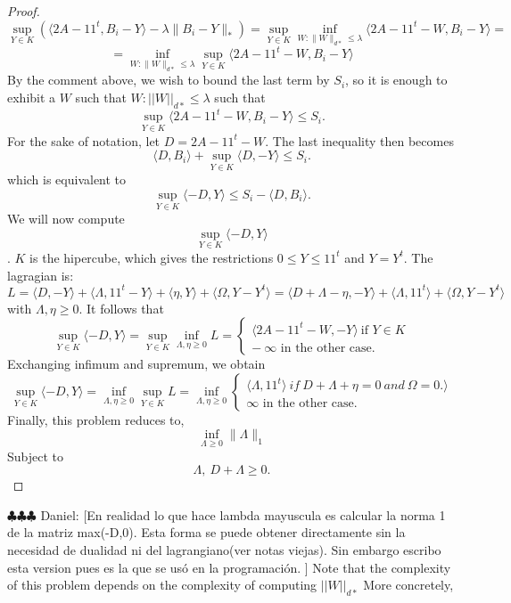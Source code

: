 \documentclass[12pt]{amsart}
\numberwithin{equation}{section}
\newcommand{\ddr}[1]{{\color{blue} \sf $\clubsuit\clubsuit\clubsuit$ Daniel: [#1]}}
\begin{document}
\begin{proof}
\[\sup_{Y\in K} \left(\langle 2A-11^t, B_i-Y\rangle -\lambda \|B_i-Y\|_*\right)=
\sup_{Y\in K} \inf_{W: \|W\|_{d*}\leq \lambda} \langle 2A-11^t-W, B_i-Y\rangle  =\]
\[=\inf_{W: \|W\|_{d*}\leq \lambda}\sup_{Y\in K}\langle 2A-11^t-W, B_i-Y\rangle 
\]
By the comment above, we wish to bound the last term by $S_i$, so it is enough to exhibit a $W$ such that $W: ||W||_{d*} \leq \lambda$ such that
\[
\sup_{Y\in K} \langle 2A-11^t-W, B_i-Y\rangle \leq S_i.
\]
For the sake of notation, let 
$D= 2A-11^t-W$.
The last inequality then becomes
\[
\langle D,B_i\rangle + \sup_{Y \in K}\langle D,-Y \rangle \leq S_i.
\]
which is equivalent to 
\[
 \sup_{Y \in K}\langle -D,Y \rangle \leq S_i-\langle D,B_i\rangle.
\]
We will now compute $$\sup_{Y \in K}\langle -D,Y \rangle$$.
$K$ is the hipercube, which gives the restrictions $0 \leq Y \leq 11^t$ and $Y=Y^t$. 
The lagragian is: 
\[
L = \langle D,-Y \rangle + \langle \Lambda,11^t-Y \rangle + \langle \eta,Y \rangle + \langle \Omega,Y-Y^t \rangle
= \langle D+\Lambda -\eta,-Y \rangle + \langle \Lambda,11^t\rangle + \langle \Omega, Y-Y^t\rangle\]
with $\Lambda,\eta \geq 0$.
It follows that
\[
\sup_{Y \in K}\langle -D,Y \rangle = \sup_{Y \in K} \inf_{\Lambda,\eta \geq 0} L = \begin{cases}
\langle 2A-11^t-W,-Y \rangle \ \text{if } Y \in K\\
- \ \infty \text{ in the other case.}
\end{cases}
\]
Exchanging infimum and supremum, we obtain  
\[
\sup_{Y \in K}\langle -D,Y \rangle = \inf_{\Lambda,\eta \geq 0}\sup_{Y \in K}L= \inf_{\Lambda,\eta \geq 0} 
\begin{cases}
\langle \Lambda, 11^t \rangle \ if \ D+\Lambda + \eta = 0 \ and \ \Omega =0.\rangle \\
\infty \text{ in the other case.}
\end{cases}
\]
Finally, this problem reduces to, 
\[
\inf_{\Lambda \geq0} \|\Lambda\|_1
\]
Subject to 
\[
\Lambda, \ D+\Lambda \geq 0.
\]
\end{proof}
\ddr{En realidad lo que hace lambda mayuscula es calcular la norma 1 de la matriz max(-D,0). Esta forma se puede obtener directamente sin la necesidad de dualidad ni del lagrangiano(ver notas viejas). Sin embargo escribo esta version pues es la que se us\'o en la programaci\'on. }
Note that the complexity of this problem depends on the complexity of computing $||W||_{d*}$
 More concretely,
\end{document}
